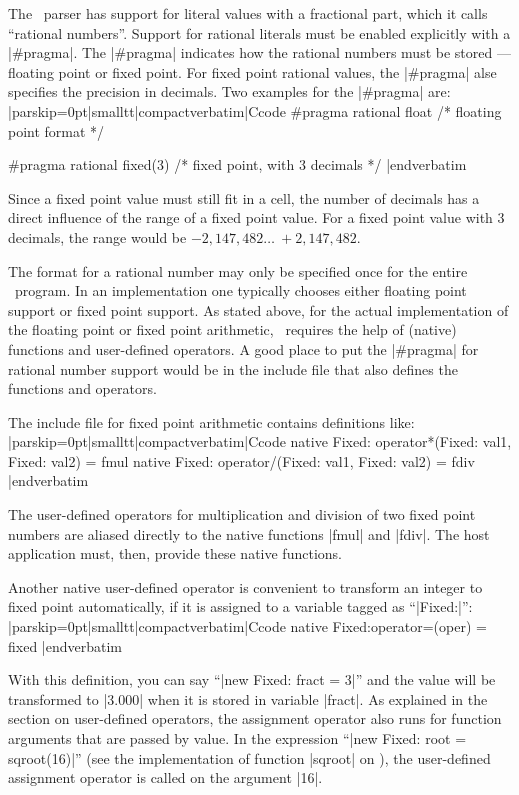 \noindent{}%
The \Small\ parser has support for literal values with a fractional part, which
it calls ``rational numbers''. Support for rational literals must be enabled
explicitly with a |#pragma|. The |#pragma| indicates how the rational numbers
must be stored ---floating point or fixed point. For fixed point rational
values, the |#pragma| alse specifies the precision in decimals. Two examples
for the |#pragma| are:
\listingx\verbatim|parskip=0pt|smalltt|compactverbatim|Ccode
#pragma rational float      /* floating point format */

#pragma rational fixed(3)   /* fixed point, with 3 decimals */
|endverbatim\endlistingx

Since a fixed point value must still fit in a cell, the number of decimals
has a direct influence of the range of a fixed point value. For a fixed point
value with 3 decimals, the range would be $-2,147,482 \dots\ +2,147,482$.

The format for a rational number may only be specified once for the entire
\Small\ program. In an implementation one typically chooses either floating
point support or fixed point support. As stated above, for the actual
implementation of the floating point or fixed point arithmetic, \Small\ requires
the help of (native) functions and user-defined operators. A good place to
put the |#pragma| for rational number support would be in the include file
that also defines the functions and operators.

The include file for fixed point arithmetic contains definitions like:
\listingx\verbatim|parskip=0pt|smalltt|compactverbatim|Ccode
native Fixed: operator*(Fixed: val1, Fixed: val2) = fmul
native Fixed: operator/(Fixed: val1, Fixed: val2) = fdiv
|endverbatim\endlistingx

The user-defined operators for multiplication and division of two fixed point
numbers are aliased directly to the native functions |fmul| and |fdiv|. The
host application must, then, provide these native functions.

Another native user-defined operator is convenient to transform an integer to
fixed point automatically, if it is assigned to a variable tagged as ``|Fixed:|'':
\listingx\verbatim|parskip=0pt|smalltt|compactverbatim|Ccode
native Fixed:operator=(oper) = fixed
|endverbatim\endlistingx

\noindent{}%
With this definition, you can say ``|new Fixed: fract = 3|'' and the value
will be transformed to |3.000| when it is stored in variable |fract|. As explained
in the section on user-defined operators, the assignment operator also runs for
function arguments that are passed by value. In the expression
``|new Fixed: root = sqroot(16)|'' (see the implementation of function |sqroot|
on ), the user-defined assignment operator is called on the
argument |16|.

